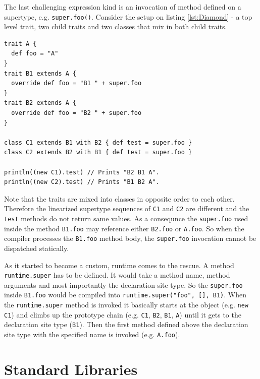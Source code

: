 \documentclass[12pt,a4paper]{report}
\begin{document}
The last challenging expression kind is an invocation of method defined on a supertype, e.g. \texttt{super.foo()}. Consider the setup on listing \ref{lst:Diamond} - a top level trait, two child traits and two classes that mix in both child traits.

\begin{minipage}{\linewidth}
\begin{lstlisting}[caption={The \texttt{super} keyword non-static behavior example.},label={lst:Diamond}]
trait A { 
  def foo = "A" 
}
trait B1 extends A { 
  override def foo = "B1 " + super.foo
}
trait B2 extends A { 
  override def foo = "B2 " + super.foo
}

class C1 extends B1 with B2 { def test = super.foo }
class C2 extends B2 with B1 { def test = super.foo }

println((new C1).test) // Prints "B2 B1 A".
println((new C2).test) // Prints "B1 B2 A".
\end{lstlisting}
\end{minipage}

Note that the traits are mixed into classes in opposite order to each other. Therefore the linearized supertype sequences of \texttt{C1} and \texttt{C2} are different and the \texttt{test} methods do not return same values. As a consequnce the \texttt{super.foo} used inside the method \texttt{B1.foo} may reference either \texttt{B2.foo} or \texttt{A.foo}. So when the compiler processes the \texttt{B1.foo} method body, the \texttt{super.foo} invocation cannot be dispatched statically.

As it started to become a custom, runtime comes to the rescue. A method \texttt{runtime.super} has to be defined. It would take a method name, method arguments and most importantly the declaration site type. So the \texttt{super.foo} inside \texttt{B1.foo} would be compiled into \texttt{runtime.super("foo", [], B1)}. When the \texttt{runtime.super} method is invoked it basically starts at the object (e.g. \texttt{new C1}) and climbs up the prototype chain (e.g. \texttt{C1}, \texttt{B2}, \texttt{B1}, \texttt{A}) until it gets to the declaration site type (\texttt{B1}). Then the first method defined above the declaration site type with the specified name is invoked (e.g. \texttt{A.foo}).

\section{Standard Libraries}
\end{document}
